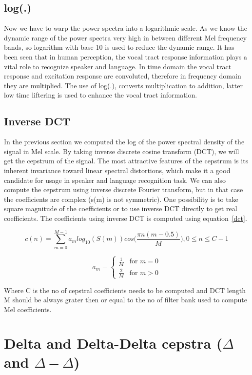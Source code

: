 \begin{spacing}{1.5}
\subsection{log(.)} 
Now we have to warp the power spectra into a logarithmic scale. As we know the dynamic range of the power spectra very high in between different Mel frequency bands, so logarithm with base 10 is used to reduce the dynamic range. It has been seen that in human perception, the vocal tract response information plays a vital role to recognize speaker and language. In time domain the vocal tract response and excitation response are convoluted, therefore in frequency domain they are multiplied. The use of log(.), converts multiplication to addition, latter low time liftering is used to enhance the vocal tract information.    
\subsection{Inverse DCT}
In the previous section we computed the log of the power spectral density of the signal in Mel scale. By taking inverse discrete cosine transform (DCT), we will get the cepstrum of the signal. The most attractive features of the cepstrum is its inherent invariance toward linear spectral distortions, which make it a good candidate for usage in speaker and language recognition task. We can also compute the cepstrum using inverse discrete Fourier transform, but in that case the coefficients are complex (s(m) is not symmetric). One possibility is to take square magnitude of the coefficients or to use inverse DCT directly to get real coefficients. The coefficients using inverse DCT is computed using equation~\ref{dct}.     

\begin{equation}
 \label{dct}
 c(n)=\sum_{m=0}^{M-1}a_{m}log_{10}(S(m))cos\Bigg(\frac{\pi n(m-0.5)}{M}\Bigg), 0 \leq n \leq C-1
\end{equation}


    $$ a_{m}=
   \begin{cases}
    \frac{1}{M} & \text{for $m=0$} \\
     \frac{2}{M} & \text{for $m > 0$}
   \end{cases}$$

Where C is the no of cepstral coefficients needs to be computed and DCT length M should be always grater then or equal to the no of filter bank used to compute Mel coefficients.

\section{Delta and Delta-Delta cepstra ($\Delta$ and $\Delta-\Delta$)}


\end{spacing}
